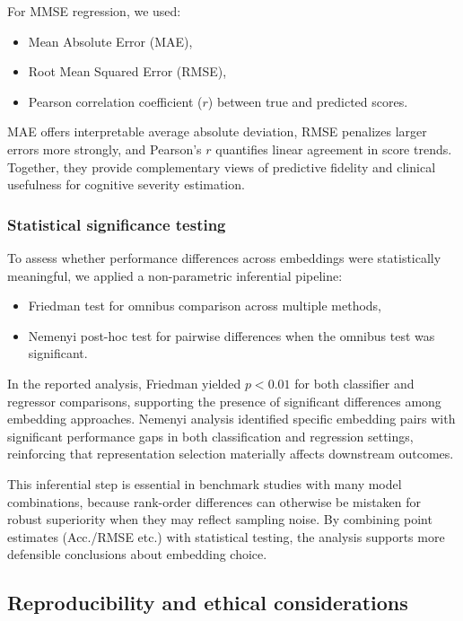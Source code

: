 \documentclass[final,5p,times]{elsarticle}
\begin{document}
For MMSE regression, we used:

\begin{itemize}
    \item Mean Absolute Error (MAE),
    \item Root Mean Squared Error (RMSE),
    \item Pearson correlation coefficient ($r$) between true and predicted scores.
\end{itemize}

MAE offers interpretable average absolute deviation, RMSE penalizes larger errors more strongly, and Pearson’s $r$ quantifies linear agreement in score trends. Together, they provide complementary views of predictive fidelity and clinical usefulness for cognitive severity estimation.

\subsubsection{Statistical significance testing}

To assess whether performance differences across embeddings were statistically meaningful, we applied a non-parametric inferential pipeline:

\begin{itemize}
    \item Friedman test for omnibus comparison across multiple methods,
    \item Nemenyi post-hoc test for pairwise differences when the omnibus test was significant.
\end{itemize}

In the reported analysis, Friedman yielded $p < 0.01$ for both classifier and regressor comparisons, supporting the presence of significant differences among embedding approaches. Nemenyi analysis identified specific embedding pairs with significant performance gaps in both classification and regression settings, reinforcing that representation selection materially affects downstream outcomes.

This inferential step is essential in benchmark studies with many model combinations, because rank-order differences can otherwise be mistaken for robust superiority when they may reflect sampling noise. By combining point estimates (Acc./RMSE etc.) with statistical testing, the analysis supports more defensible conclusions about embedding choice.

\subsection{Reproducibility and ethical considerations}
\end{document}
